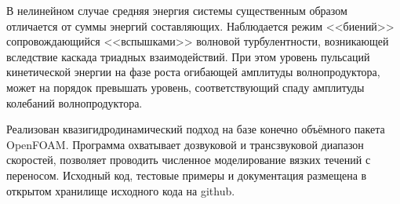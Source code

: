 В нелинейном случае средняя энергия системы существенным образом отличается от суммы энергий составляющих. Наблюдается режим <<биений>> сопровождающийся <<вспышками>> волновой турбулентности, возникающей вследствие каскада триадных взаимодействий. При этом уровень пульсаций кинетической
энергии на фазе роста огибающей амплитуды волнопродуктора, может на порядок превышать уровень, соответствующий спаду амплитуды колебаний волнопродуктора.

Реализован квазигидродинамический подход на базе конечно объёмного пакета OpenFOAM. Программа охватывает дозвуковой и трансзвуковой диапазон скоростей, позволяет проводить численное моделирование вязких течений с переносом. Исходный код, тестовые примеры и документация размещена в открытом хранилище исходного кода на github. 